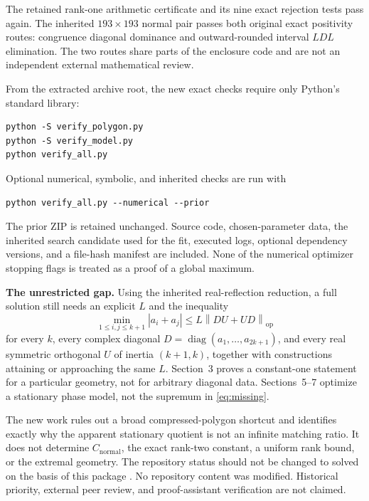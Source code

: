 \documentclass[11pt]{article}
\theoremstyle{remark}
\newcommand{\op}{\mathrm{op}}
\newcommand{\norm}[1]{\left\lVert#1\right\rVert_{\op}}
\newcommand{\Cstar}{C_{\mathrm{normal}}}
\newcommand{\diag}{\operatorname{diag}}
\begin{document}
The retained rank-one arithmetic certificate and its nine exact rejection tests pass again. The inherited $193\times193$ normal pair passes both original exact positivity routes: congruence diagonal dominance and outward-rounded interval $LDL$ elimination. The two routes share parts of the enclosure code and are not an independent external mathematical review.

From the extracted archive root, the new exact checks require only Python's standard library:
\begin{verbatim}
python -S verify_polygon.py
python -S verify_model.py
python verify_all.py
\end{verbatim}
Optional numerical, symbolic, and inherited checks are run with
\begin{verbatim}
python verify_all.py --numerical --prior
\end{verbatim}
The prior ZIP is retained unchanged. Source code, chosen-parameter data, the inherited search candidate used for the fit, executed logs, optional dependency versions, and a file-hash manifest are included. None of the numerical optimizer stopping flags is treated as a proof of a global maximum.

\textbf{The unrestricted gap.} Using the inherited real-reflection reduction, a full solution still needs an explicit $L$ and the inequality
\begin{equation}\label{eq:missing}
 \min_{1\le i,j\le k+1}|a_i+a_j|
 \le L\norm{DU+UD}
\end{equation}
for every $k$, every complex diagonal $D=\diag(a_1,\ldots,a_{2k+1})$, and every real symmetric orthogonal $U$ of inertia $(k+1,k)$, together with constructions attaining or approaching the same $L$. Section~3 proves a constant-one statement for a particular geometry, not for arbitrary diagonal data. Sections~5--7 optimize a stationary phase model, not the supremum in \eqref{eq:missing}.

The new work rules out a broad compressed-polygon shortcut and identifies exactly why the apparent stationary quotient is not an infinite matching ratio. It does not determine $\Cstar$, the exact rank-two constant, a uniform rank bound, or the extremal geometry. The repository status should not be changed to solved on the basis of this package \cite{guidelines}. No repository content was modified. Historical priority, external peer review, and proof-assistant verification are not claimed.

\appendix
\end{document}
